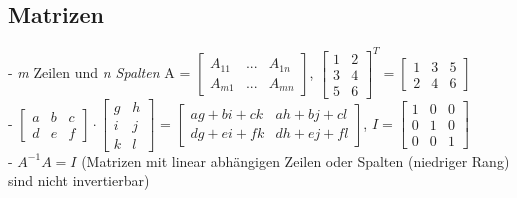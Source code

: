 \documentclass{report}
\begin{document}
\subsection{Matrizen}
- \textit{m} Zeilen und \textit{n Spalten}
A = $\begin{bmatrix}A_{11} & ... & A_{1n}\\A_{m1} & ... & A_{mn} \end{bmatrix}$,
$\begin{bmatrix}1 & 2\\3 & 4\\5 & 6\end{bmatrix}^T = \begin{bmatrix}1 & 3 & 5\\2 & 4 & 6\end{bmatrix}$\\
- $\begin{bmatrix}a & b & c\\d & e & f\end{bmatrix}\cdot \begin{bmatrix}g & h\\i & j\\k & l\end{bmatrix}$
= $\begin{bmatrix}ag + bi + ck & ah + bj + cl\\dg + ei + fk & dh + ej + fl\end{bmatrix}$,
$I = \begin{bmatrix}1 & 0 & 0\\0 & 1 & 0\\0 & 0 &1\end{bmatrix}$\\
- $A^{-1}A = I$ (Matrizen mit linear abhängigen Zeilen oder Spalten (niedriger Rang) sind nicht invertierbar)
\end{document}
